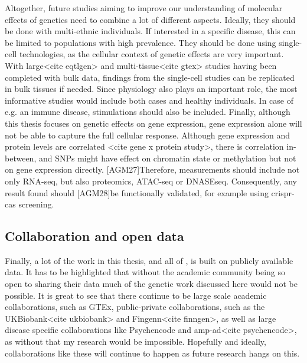 Altogether, future studies aiming to improve our understanding of molecular effects of genetics need to combine a lot of different aspects. Ideally, they should be done with multi-ethnic individuals. If interested in a specific disease, this can be limited to populations with high prevalence. They should be done using single-cell technologies, as the cellular context of genetic effects are very important. With large<cite eqtlgen> and multi-tissue<cite gtex> studies having been completed with bulk data, findings from the single-cell studies can be replicated in bulk tissues if needed. Since physiology also plays an important role, the most informative studies would include both cases and healthy individuals. In case of e.g. an immune disease, stimulations should also be included. Finally, although this thesis focuses on genetic effects on gene expression, gene expression alone will not be able to capture the full cellular response. Although gene expression and protein levels are correlated <cite gene x protein study>, there is correlation in-between, and SNPs might have effect on chromatin state or methylation but not on gene expression directly. [AGM27]Therefore, measurements should include not only RNA-seq, but also proteomics, ATAC-seq or DNASEseq. Consequently, any result found should [AGM28]be functionally validated, for example using crispr-cas screening.


\subsection{Collaboration and open data}
Finally, a lot of the work in this thesis, and all of , is built on publicly available data. It has to be highlighted that without the academic community being so open to sharing their data much of the genetic work discussed here would not be possible. It is great to see that there continue to be large scale academic collaborations, such as GTEx, public-private collaborations, such as the UKBiobank<cite ukbiobank> and Fingenn<cite finngen>, as well as large disease specific collaborations like Psychencode and amp-ad<cite psychencode>, as without that my research would be impossible. Hopefully and ideally, collaborations like these will continue to happen as future research hangs on this. 




